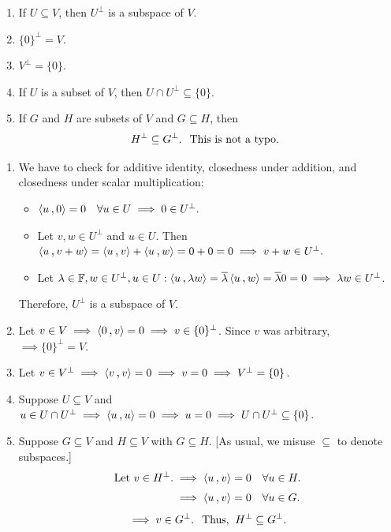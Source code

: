 \begin{thm}
  \label{thm: properties of the orthogonal complement}
  \phantom{.}
  \begin{enumerate}[label=\textbf{(\alph*)}]
    \item If $U \subseteq V$, then $U^{\bot}$ is a subspace of $V$.
    \item $\{0\}^{\bot} = V$.
    \item $V^{\bot} = \{0\}.$
    \item If $U$ is a subset of $V$, then $U \cap U^{\bot} \subseteq \{0\}$.
    \item If $G$ and $H$ are subsets of $V$ and $G \subseteq H$, then
    \begin{equation}
      H^{\bot} \subseteq G^{\bot}. \;\;\, \text{This is not a typo.}\;\;
    \end{equation}
  \end{enumerate}
\end{thm}
\begin{prf}
  \phantom{.}
  \begin{enumerate}[label=\textbf{(\alph*)}]
    \item { We have to check for additive identity, closedness under addition, and closedness under scalar multiplication:
    \begin{itemize}
      \item $\ip{u}{0}=0 \quad \forall u\in U \implies 0 \in U^{\bot}.$
      \item Let $v,w \in U^{\bot}$ and $u \in U$. Then $\ip{u}{v+w} = \ip{u}{v} + \ip{u}{w} = 0 + 0 = 0 \implies v+w \in U^{\bot}.$
      \item Let $\lambda \in \myF, w \in U^{\bot}, u \in U: \ip{u}{\lambda w} = \overline \lambda \ip{u}{w} = \overline \lambda 0 = 0 \implies \lambda w \in U^{\bot}$.
    \end{itemize}
    Therefore, $U^{\bot}$ is a subspace of $V$.
    }
    \item Let $v \in V \implies \ip{0}{v} = 0 \implies v \in \{0\}^{\bot}$. Since $v$ was arbitrary, $\implies \{0\}^{\bot}=V$.
    \item Let $v \in V^{\bot} \implies \ip{v}{v}=0 \implies v=0 \implies V^{\bot} =\{0\}$.
    \item Suppose $U \subseteq V$ and $u \in U \cap U^{\bot} \implies \ip{u}{u}=0 \implies u = 0 \implies U \cap U^{\bot} \subseteq \{0\}$.
    \item Suppose $G\subseteq V$ and $H \subseteq V$ with $G \subseteq H$. [As usual, we misuse $\subseteq$ to denote subspaces.]
    \[
      \begin{aligned}
        \text{Let $v\in H^{\bot}$.}
        &\implies \ip{u}{v} = 0 \quad \forall u \in H. \\
        & \implies  \ip{u}{v} = 0 \quad \forall u \in G. \\
      \end{aligned}
    \]
    \[
      \implies v \in G^{\bot}. \;\;\, \text{Thus,}\;\; H^{\bot} \subseteq G^{\bot}.
    \]
  \end{enumerate}
  \vspace{-1em}
\end{prf}

